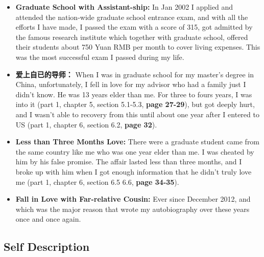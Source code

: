 \documentclass[9pt,b5paper]{article}
\begin{document}
\begin{itemize}
\item \textbf{Graduate School with Assistant-ship:} In Jan 2002 I applied and attended the nation-wide graduate school entrance exam, and with all the efforts I have made, I passed the exam with a score of 315, got admitted by the famous research institute which together with graduate school, offered their students about 750 Yuan RMB per month to cover living expenses. This was the most successful exam I passed during my life.
\item \textbf{爱上自已的导师：} When I was in graduate school for my master's degree in China, unfortunately, I fell in love for my advisor who had a family just I didn't know. He was 13 years elder than me. For three to fours years, I was into it (part 1, chapter 5, section 5.1-5.3, \textbf{page 27-29}), but  got deeply hurt, and I wasn't able to recovery from this until about one year after I entered to US (part 1, chapter 6, section 6.2, \textbf{page 32}).
\item \textbf{Less than Three Months Love:} There were a graduate student came from the same country like me who was one year elder than me. I was cheated by him by his false promise. The affair lasted less than three months, and I broke up with him when I got enough information that he didn't truly love me (part 1, chapter 6, section 6.5 6.6, \textbf{page 34-35}).
\item \textbf{Fall in Love with Far-relative Cousin:} Ever since December 2012, and which was the major reason that wrote my autobiography over these years once and once again.
\end{itemize}

\subsection{Self Description}
\label{sec-9-2}
\end{document}
